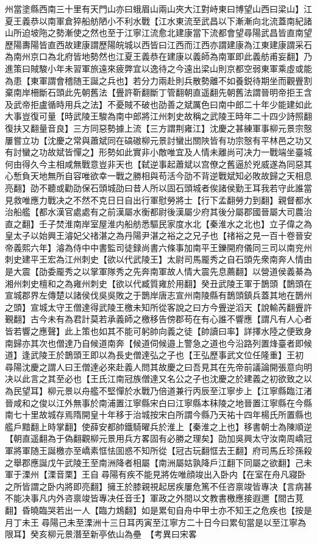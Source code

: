州當塗縣西南三十里有天門山亦曰蛾眉山兩山夾大江對峙東曰博望山西曰梁山】江夏王義恭以南軍倉猝船舫陋小不利水戰【江水東流至武昌以下漸漸向北流蓋南紀諸山所迫坡陁之勢漸使之然也至于江寧江流愈北建康當下流都會望尋陽武昌皆直南望歷陽夀陽皆直西故建康謂歷陽皖城以西皆曰江西而江西亦謂建康為江東建康謂采石為南州京口為北府皆地勢然也江夏王義恭在建康以義師為南軍即此義舫甫妄翻】乃進策曰賊駿小年未習軍旅遠來疲弊宜以逸待之今遠出梁山則京都空弱東軍乘虛或能為患【東軍謂會稽随王誕之兵也】若分力兩赴則兵散勢離不如養鋭待期坐而觀舋割棄南岸柵斷石頭此先朝舊法【舋許靳翻斷丁管翻朝直遥翻先朝舊法謂晉明帝拒王含及武帝拒盧循時用兵之法】不憂賊不破也劭善之斌厲色曰南中郎二十年少能建如此大事豈復可量【時武陵王駿為南中郎將江州刺史故稱之武陵王時年二十四少詩照翻復扶又翻量音良】三方同惡勢據上流【三方謂荆雍江】沈慶之甚練軍事柳元景宗慤屢嘗立功【沈慶之常與蕭斌同在碻磝柳元景討蠻出關陜皆有功宗慤有平林邑之功又有討蠻之功故斌皆憚之】形勢如此實非小敵唯宜及人情未離尚可决力一戰端坐臺城何由得久今主相咸無戰意豈非天也【弑逆事起蕭斌以宫僚之舊逼於兇威遂為同惡其心慙負天地無所自容唯欲幸一戰之勝相與苟活今劭不背逆戰斌知必敗故歸之天相息亮翻】劭不聽或勸劭保石頭城劭曰昔人所以固石頭城者俟諸侯勤王耳我若守此誰當見救唯應力戰决之不然不克日日自出行軍慰勞將士【行下孟翻勞力到翻】親督都水治船艦【都水漢官處處有之前漢屬水衡都尉後漢屬少府其後分屬郡國晉屬大司農治直之翻】壬子焚淮南岸室屋淮内船舫悉驅民家度水北【秦淮水之北也】立子偉之為皇太子以始興王濬妃父禇湛之為丹陽尹湛之裕之之兄子也【禇裕之見一百十卷晉安帝義熙六年】濬為侍中中書監司徒録尚書六條事加南平王鑠開府儀同三司以南兖州刺史建平王宏為江州刺史【欲以代武陵王】太尉司馬龎秀之自石頭先衆南奔人情由是大震【劭委龎秀之以掌軍隊秀之先奔南軍故人情大震先息薦翻】以營道侯義綦為湘州刺史檀和之為雍州刺史【欲以代臧質雍於用翻】癸丑武陵王軍于鵲頭【鵲頭在宣城郡界左傳楚以諸侯伐吳吳敗之于鵲岸唐志宣州南陵縣有鵲頭鎮兵蓋其地在鵲州之頭】宣城太守王僧達得武陵王檄未知所從客說之曰方今舋逆滔天【說輸芮翻舋許覲翻】古今未有為君計莫若承義師之檄移告傍郡苟在有心誰不響應【謂凡有人心者皆若響之應聲】此上策也如其不能可躬帥向義之徒【帥讀曰率】詳擇水陸之便致身南歸亦其次也僧達乃自候道南奔【候道伺候邉上警急之道也今沿路列置烽臺者即候道】逢武陵王於鵲頭王即以為長史僧達弘之子也【王弘歷事武文位任隆重】王初尋陽沈慶之謂人曰王僧達必來赴義人問其故慶之曰吾見其在先帝前議論開張意向明决以此言之其至必也【王氏江南冠族僧達又名公之子也沈慶之於建義之初欲致之以為民望耳】柳元景以舟艦不堅憚於水戰乃倍道兼行丙辰至江寧步上【江寧縣臨江渚晉咸和之俊以江外無事於南浦置江寧縣宋白曰江寧縣本秣陵之地晉置江寧縣在今縣南七十里故城存焉隋開皇十年移于治城按宋白所謂今縣乃天祐十四年楊氏所置縣也艦戶黯翻上時掌翻】使薛安都帥鐵騎曜兵於淮上【秦淮之上也】移書朝士為陳順逆【朝直遥翻為于偽翻觀柳元景用兵方畧固有必勝之理矣】劭加吳興太守汝南周嶠冠軍將軍随王誕檄亦至嶠素恇怯囬惑不知所從【冠古玩翻恇去王翻】府司馬丘珍孫殺之舉郡應誕戊午武陵王至南洲降者相屬【南洲屬姑孰降戶江翻下同屬之欲翻】己未軍于溧州【溧音栗】王自尋陽有疾不能見將佐唯顔竣出入卧内【在室在舟凡寢卧之所皆謂之卧内將即亮翻】擁王於膝親視起居疾屢危篤不任咨禀竣皆專决【言病甚不能决事凡内外咨禀竣皆專决任音壬】軍政之外間以文教書檄應接遐邇【間古莧翻】昏曉臨哭若出一人【臨力鴆翻】如是累旬自舟中甲士亦不知王之危疾也【按是月丁未王尋陽己未至溧洲十三日耳丙寅至江寧方二十日今曰累旬當是以至江寧為限耳】癸亥柳元景潛至新亭依山為壘　【考異曰宋畧